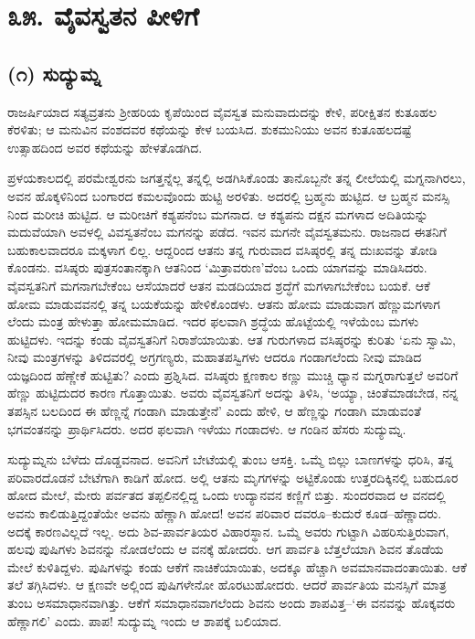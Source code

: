 
\chapter{೩೫. ವೈವಸ್ವತನ ಪೀಳಿಗೆ}

\section{(೧) ಸುದ್ಯುಮ್ನ}

ರಾಜರ್ಷಿಯಾದ ಸತ್ಯವ್ರತನು ಶ್ರೀಹರಿಯ ಕೃಪೆಯಿಂದ ವೈವಸ್ವತ ಮನುವಾದುದನ್ನು ಕೇಳಿ, ಪರೀಕ್ಷಿತನ ಕುತೂಹಲ ಕೆರಳಿತು; ಆ ಮನುವಿನ ವಂಶದವರ ಕಥೆಯನ್ನು ಕೇಳ ಬಯಸಿದ. ಶುಕಮುನಿಯು ಅವನ ಕುತೂಹಲದಷ್ಟೆ ಉತ್ಸಾಹದಿಂದ ಅವರ ಕಥೆಯನ್ನು ಹೇಳತೊಡಗಿದ.

ಪ್ರಳಯಕಾಲದಲ್ಲಿ ಪರಮೇಶ್ವರನು ಜಗತ್ತನ್ನೆಲ್ಲ ತನ್ನಲ್ಲಿ ಅಡಗಿಸಿಕೊಂಡು ತಾನೊಬ್ಬನೇ ತನ್ನ ಲೀಲೆಯಲ್ಲಿ ಮಗ್ನನಾಗಿರಲು, ಅವನ ಹೊಕ್ಕಳಿನಿಂದ ಬಂಗಾರದ ಕಮಲವೊಂದು ಹುಟ್ಟಿ ಅರಳಿತು. ಅದರಲ್ಲಿ ಬ್ರಹ್ಮನು ಹುಟ್ಟಿದ. ಆ ಬ್ರಹ್ಮನ ಮನಸ್ಸಿ ನಿಂದ ಮರೀಚಿ ಹುಟ್ಟಿದ. ಆ ಮರೀಚಿಗೆ ಕಶ್ಯಪನೆಂಬ ಮಗನಾದ. ಆ ಕಶ್ಯಪನು ದಕ್ಷನ ಮಗಳಾದ ಅದಿತಿಯನ್ನು ಮದುವೆಯಾಗಿ ಅವಳಲ್ಲಿ ವಿವಸ್ವತನೆಂಬ ಮಗನನ್ನು ಪಡೆದ. ಇವನ ಮಗನೇ ವೈವಸ್ವತಮನು. ರಾಜನಾದ ಈತನಿಗೆ ಬಹುಕಾಲವಾದರೂ ಮಕ್ಕಳಾಗ ಲಿಲ್ಲ. ಆದ್ದರಿಂದ ಆತನು ತನ್ನ ಗುರುವಾದ ವಸಿಷ್ಠರಲ್ಲಿ ತನ್ನ ದುಃಖವನ್ನು ತೋಡಿ ಕೊಂಡನು. ವಸಿಷ್ಠರು ಪುತ್ರಸಂತಾನಕ್ಕಾಗಿ ಆತನಿಂದ ‘ಮಿತ್ರಾವರುಣ’ವೆಂಬ ಒಂದು ಯಾಗವನ್ನು ಮಾಡಿಸಿದರು. ವೈವಸ್ವತನಿಗೆ ಮಗನಾಗಬೇಕೆಂಬ ಆಸೆಯಾದರೆ ಆತನ ಮಡದಿಯಾದ ಶ್ರದ್ಧೆಗೆ ಮಗಳಾಗಬೇಕೆಂಬ ಬಯಕೆ. ಆಕೆ ಹೋಮ ಮಾಡುವವನಲ್ಲಿ ತನ್ನ ಬಯಕೆಯನ್ನು ಹೇಳಿಕೊಂಡಳು. ಆತನು ಹೋಮ ಮಾಡುವಾಗ ಹೆಣ್ಣುಮಗಳಾಗ ಲೆಂದು ಮಂತ್ರ ಹೇಳುತ್ತಾ ಹೋಮಮಾಡಿದ. ಇದರ ಫಲವಾಗಿ ಶ್ರದ್ಧೆಯ ಹೊಟ್ಟೆಯಲ್ಲಿ ಇಳೆಯೆಂಬ ಮಗಳು ಹುಟ್ಟಿದಳು. ಇದನ್ನು ಕಂಡು ವೈವಸ್ವತನಿಗೆ ನಿರಾಶೆಯಾಯಿತು. ಆತ ಗುರುಗಳಾದ ವಸಿಷ್ಠರನ್ನು ಕುರಿತು ‘ಏನು ಸ್ವಾಮಿ, ನೀವು ಮಂತ್ರಗಳನ್ನು ತಿಳಿದವರಲ್ಲಿ ಅಗ್ರಗಣ್ಯರು, ಮಹಾತಪಸ್ವಿಗಳು ಆದರೂ ಗಂಡಾಗಲೆಂದು ನೀವು ಮಾಡಿದ ಯಜ್ಞದಿಂದ ಹೆಣ್ಣೇಕೆ ಹುಟ್ಟಿತು? ಎಂದು ಪ್ರಶ್ನಿಸಿದ. ವಸಿಷ್ಠರು ಕ್ಷಣಕಾಲ ಕಣ್ಣು ಮುಚ್ಚಿ ಧ್ಯಾನ ಮಗ್ನರಾಗುತ್ತಲೆ ಅವರಿಗೆ ಹೆಣ್ಣು ಹುಟ್ಟಿದುದರ ಕಾರಣ ಗೊತ್ತಾಯಿತು. ಅವರು ವೈವಸ್ವತನಿಗೆ ಅದನ್ನು ತಿಳಿಸಿ, ‘ಅಯ್ಯಾ, ಚಿಂತೆಮಾಡಬೇಡ, ನನ್ನ ತಪಸ್ಸಿನ ಬಲದಿಂದ ಈ ಹೆಣ್ಣನ್ನೆ ಗಂಡಾಗಿ ಮಾಡುತ್ತೇನೆ’ ಎಂದು ಹೇಳಿ, ಆ ಹೆಣ್ಣನ್ನು ಗಂಡಾಗಿ ಮಾಡುವಂತೆ ಭಗವಂತನನ್ನು ಪ್ರಾರ್ಥಿಸಿದರು. ಅದರ ಫಲವಾಗಿ ಇಳೆಯು ಗಂಡಾದಳು. ಆ ಗಂಡಿನ ಹೆಸರು ಸುದ್ಯುಮ್ನ.

ಸುದ್ಯುಮ್ನನು ಬೆಳೆದು ದೊಡ್ಡವನಾದ. ಅವನಿಗೆ ಬೇಟೆಯಲ್ಲಿ ತುಂಬ ಆಸಕ್ತಿ. ಒಮ್ಮೆ ಬಿಲ್ಲು ಬಾಣಗಳನ್ನು ಧರಿಸಿ, ತನ್ನ ಪರಿವಾರದೊಡನೆ ಬೇಟೆಗಾಗಿ ಕಾಡಿಗೆ ಹೋದ. ಅಲ್ಲಿ ಆತನು ಮೃಗಗಳನ್ನು ಅಟ್ಟಿಕೊಂಡು ಉತ್ತರದಿಕ್ಕಿನಲ್ಲಿ ಬಹುದೂರ ಹೋದ ಮೇಲೆ, ಮೇರು ಪರ್ವತದ ತಪ್ಪಲಿನಲ್ಲಿದ್ದ ಒಂದು ಉದ್ಯಾನವನ ಕಣ್ಣಿಗೆ ಬಿತ್ತು. ಸುಂದರವಾದ ಆ ವನದಲ್ಲಿ ಅವನು ಕಾಲಿಡುತ್ತಿದ್ದಂತೆಯೇ ಅವನು ಹೆಣ್ಣಾಗಿ ಹೋದ! ಅವನ ಪರಿವಾರ ದವರೂ–ಕುದುರೆ ಕೂಡ–ಹೆಣ್ಣಾದರು. ಅದಕ್ಕೆ ಕಾರಣವಿಲ್ಲದೆ ಇಲ್ಲ. ಅದು ಶಿವ-ಪಾರ್ವತಿಯರ ವಿಹಾರಸ್ಥಾನ. ಒಮ್ಮೆ ಅವರು ಗುಟ್ಟಾಗಿ ವಿಹರಿಸುತ್ತಿರುವಾಗ, ಹಲವು ಪುಷಿಗಳು ಶಿವನನ್ನು ನೋಡಲೆಂದು ಆ ವನಕ್ಕೆ ಹೋದರು. ಆಗ ಪಾರ್ವತಿ ಬೆತ್ತಲೆಯಾಗಿ ಶಿವನ ತೊಡೆಯ ಮೇಲೆ ಕುಳಿತಿದ್ದಳು. ಪುಷಿಗಳನ್ನು ಕಂಡು ಆಕೆಗೆ ನಾಚಿಕೆಯಾಯಿತು, ಅದಕ್ಕೂ ಹೆಚ್ಚಾಗಿ ಅವಮಾನವಾದಂತಾಯಿತು. ಆಕೆ ತಲೆ ತಗ್ಗಿಸಿದಳು. ಆ ಕ್ಷಣವೇ ಅಲ್ಲಿಂದ ಪುಷಿಗಳೇನೋ ಹೊರಟುಹೋದರು. ಆದರೆ ಪಾರ್ವತಿಯ ಮನಸ್ಸಿಗೆ ಮಾತ್ರ ತುಂಬ ಅಸಮಾಧಾನವಾಗಿತ್ತು. ಆಕೆಗೆ ಸಮಾಧಾನವಾಗಲೆಂದು ಶಿವನು ಅಂದು ಶಾಪವಿತ್ತ–‘ಈ ವನವನ್ನು ಹೊಕ್ಕವರು ಹೆಣ್ಣಾಗಲಿ’ ಎಂದು. ಪಾಪ! ಸುದ್ಯುಮ್ನ ಇಂದು ಆ ಶಾಪಕ್ಕೆ ಬಲಿಯಾದ.

